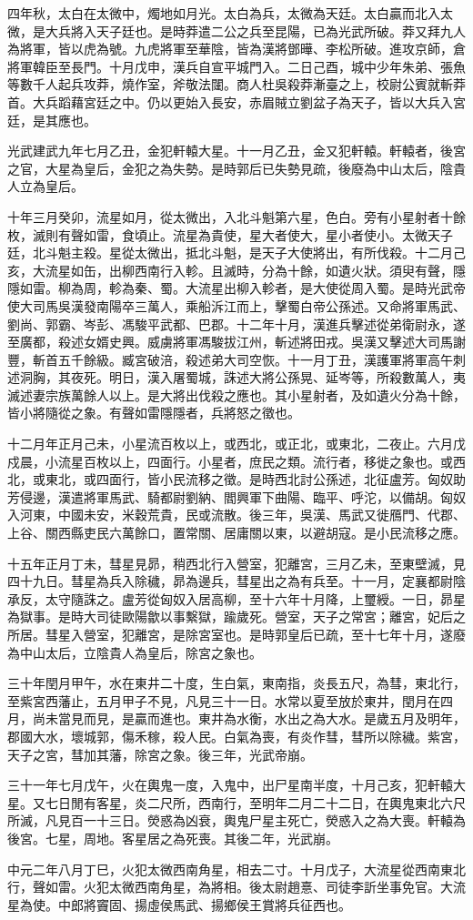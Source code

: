 \begin{pinyinscope}
四年秋，太白在太微中，燭地如月光。太白為兵，太微為天廷。太白贏而北入太微，是大兵將入天子廷也。是時莽遣二公之兵至昆陽，已為光武所破。莽又拜九人為將軍，皆以虎為號。九虎將軍至華陰，皆為漢將鄧曄、李松所破。進攻京師，倉將軍韓臣至長門。十月戊申，漢兵自宣平城門入。二日己酉，城中少年朱弟、張魚等數千人起兵攻莽，燒作室，斧敬法闥。商人杜吳殺莽漸臺之上，校尉公賓就斬莽首。大兵蹈藉宮廷之中。仍以更始入長安，赤眉賊立劉盆子為天子，皆以大兵入宮廷，是其應也。

光武建武九年七月乙丑，金犯軒轅大星。十一月乙丑，金又犯軒轅。軒轅者，後宮之官，大星為皇后，金犯之為失勢。是時郭后已失勢見疏，後廢為中山太后，陰貴人立為皇后。

十年三月癸卯，流星如月，從太微出，入北斗魁第六星，色白。旁有小星射者十餘枚，滅則有聲如雷，食頃止。流星為貴使，星大者使大，星小者使小。太微天子廷，北斗魁主殺。星從太微出，抵北斗魁，是天子大使將出，有所伐殺。十二月己亥，大流星如缶，出柳西南行入軫。且滅時，分為十餘，如遺火狀。須臾有聲，隱隱如雷。柳為周，軫為秦、蜀。大流星出柳入軫者，是大使從周入蜀。是時光武帝使大司馬吳漢發南陽卒三萬人，乘船泝江而上，擊蜀白帝公孫述。又命將軍馬武、劉尚、郭霸、岑彭、馮駿平武都、巴郡。十二年十月，漢進兵擊述從弟衛尉永，遂至廣都，殺述女婿史興。威虜將軍馮駿拔江州，斬述將田戎。吳漢又擊述大司馬謝豐，斬首五千餘級。臧宮破涪，殺述弟大司空恢。十一月丁丑，漢護軍將軍高午刺述洞胸，其夜死。明日，漢入屠蜀城，誅述大將公孫晃、延岑等，所殺數萬人，夷滅述妻宗族萬餘人以上。是大將出伐殺之應也。其小星射者，及如遺火分為十餘，皆小將隨從之象。有聲如雷隱隱者，兵將怒之徵也。

十二月年正月己未，小星流百枚以上，或西北，或正北，或東北，二夜止。六月戊戍晨，小流星百枚以上，四面行。小星者，庶民之類。流行者，移徙之象也。或西北，或東北，或四面行，皆小民流移之徵。是時西北討公孫述，北征盧芳。匈奴助芳侵邊，漢遣將軍馬武、騎都尉劉納、閻興軍下曲陽、臨平、呼沱，以備胡。匈奴入河東，中國未安，米穀荒貴，民或流散。後三年，吳漢、馬武又徙鴈門、代郡、上谷、關西縣吏民六萬餘口，置常關、居庸關以東，以避胡寇。是小民流移之應。

十五年正月丁未，彗星見昴，稍西北行入營室，犯離宮，三月乙未，至東壁滅，見四十九日。彗星為兵入除穢，昴為邊兵，彗星出之為有兵至。十一月，定襄都尉陰承反，太守隨誅之。盧芳從匈奴入居高柳，至十六年十月降，上璽綬。一日，昴星為獄事。是時大司徒歐陽歙以事繫獄，踰歲死。營室，天子之常宮；離宮，妃后之所居。彗星入營室，犯離宮，是除宮室也。是時郭皇后已疏，至十七年十月，遂廢為中山太后，立陰貴人為皇后，除宮之象也。

三十年閏月甲午，水在東井二十度，生白氣，東南指，炎長五尺，為彗，東北行，至紫宮西藩止，五月甲子不見，凡見三十一日。水常以夏至放於東井，閏月在四月，尚未當見而見，是贏而進也。東井為水衡，水出之為大水。是歲五月及明年，郡國大水，壞城郭，傷禾稼，殺人民。白氣為喪，有炎作彗，彗所以除穢。紫宮，天子之宮，彗加其藩，除宮之象。後三年，光武帝崩。

三十一年七月戊午，火在輿鬼一度，入鬼中，出尸星南半度，十月己亥，犯軒轅大星。又七日閒有客星，炎二尺所，西南行，至明年二月二十二日，在輿鬼東北六尺所滅，凡見百一十三日。熒惑為凶衰，輿鬼尸星主死亡，熒惑入之為大喪。軒轅為後宮。七星，周地。客星居之為死喪。其後二年，光武崩。

中元二年八月丁巳，火犯太微西南角星，相去二寸。十月戊子，大流星從西南東北行，聲如雷。火犯太微西南角星，為將相。後太尉趙憙、司徒李訢坐事免官。大流星為使。中郎將竇固、揚虛侯馬武、揚鄉侯王賞將兵征西也。


\end{pinyinscope}